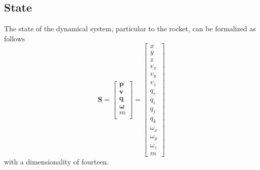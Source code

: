 \documentclass{article}
\begin{document}
\subsection{State}
The state of the dynamical system, particular to the rocket, can be formalized as follows
$$
\mathbf{S} =
\left[
\begin{array}{cccc}
\mathbf{p}\\
\mathbf{v}\\
\mathbf{q}\\
\mathbf{\omega}\\
m\\
\end{array}\right]
=\left[
\begin{array}{cccccccccccccc}
x\\y\\z\\v_x\\v_y\\v_z\\q_r\\q_i\\q_j\\q_k\\
\omega_x \\ \omega_y \\ \omega_z \\ m
\end{array}\right]
$$ with a dimensionality of fourteen.
\end{document}
